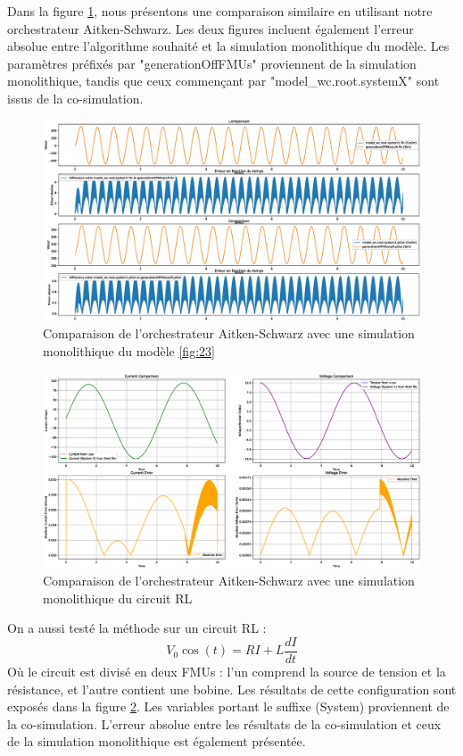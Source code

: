 Dans la figure \ref{fig:25}, nous présentons une comparaison similaire en utilisant notre orchestrateur Aitken-Schwarz. Les deux figures incluent également l'erreur absolue entre l'algorithme souhaité et la simulation monolithique du modèle. Les paramètres préfixés par "generationOffFMUs" proviennent de la simulation monolithique, tandis que ceux commençant par "model\_wc.root.systemX" sont issus de la co-simulation.
\newpage
\begin{figure}[hbt!]
    \centering
    \includegraphics[width =\textwidth]{generationFMUSchwarz.eps}
    \caption{Comparaison de l'orchestrateur Aitken-Schwarz avec une simulation monolithique du modèle \ref{fig:23}}
    \label{fig:25}
\end{figure}
\begin{figure}[hbt!]
    \centering
    \includegraphics[width =\textwidth]{RLschwarz.eps}
    \caption{Comparaison de l'orchestrateur Aitken-Schwarz avec une simulation monolithique du circuit RL}
    \label{fig:26}
\end{figure}

On a aussi testé la méthode sur un circuit RL : 
\begin{equation}
    V_0 \cos(t) = RI + L \frac{dI}{dt}
\end{equation}
Où le circuit est divisé en deux FMUs : l'un comprend la source de tension et la résistance, et l'autre contient une bobine. Les résultats de cette configuration sont exposés dans la figure \ref{fig:26}. Les variables portant le suffixe (System) proviennent de la co-simulation. L'erreur absolue entre les résultats de la co-simulation et ceux de la simulation monolithique est également présentée.

